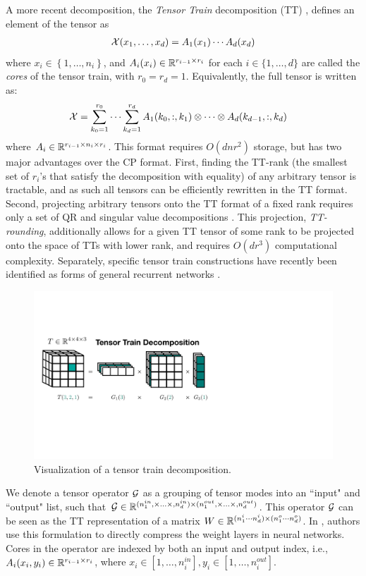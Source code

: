 A more recent decomposition, the \textit{Tensor Train} decomposition (TT) \citep{oseledets2011tensor}, defines an element of the tensor as
\begin{align}
\mathcal{X}(x_1,\ldots,x_d) = A_1(x_1)\cdots A_d(x_d)
\end{align}
where $x_i \in \left\{1,\ldots, n_i\right\}$, and $A_i(x_i) \in \mathbb{R}^{r_{i-1} \times r_{i}}$ for each $i \in \{1,\ldots,d\}$ are called the \textit{cores} of the tensor train, with $r_0 = r_d = 1$. Equivalently, the full tensor is written as:
\begin{align}\label{eq:fullTT}
	\mathcal{X} &= \sum_{k_0 = 1}^{r_0} \cdots \sum_{k_d = 1}^{r_d} A_1(k_0,:,k_1) \otimes \cdots \otimes A_d(k_{d-1},:,k_d) 
\end{align}
where $A_i \in \mathbb{R}^{r_{i-1}\times n_i \times r_i} $. 
This format requires $O(dnr^2)$ storage, but has two major advantages over the CP format. First, finding the TT-rank (the smallest set of $r_i$'s that satisfy the decomposition with equality) of any arbitrary tensor is tractable, and as such all tensors can be efficiently rewritten in the TT format. Second, projecting arbitrary tensors onto the TT format of a fixed rank requires only a set of QR and singular value decompositions \citep{oseledets2011tensor}. This projection, \textit{TT-rounding}, additionally allows for a given TT tensor of some rank to be projected onto the space of TTs with lower rank, and requires $O(dr^3)$ computational complexity. Separately, specific tensor train constructions have recently been identified as forms of general recurrent networks \citep{khrulkov2018generalized}.
\begin{figure}
	\centering
	\includegraphics[width=\textwidth,trim={0 14cm 25cm 10cm},clip]{2_bknd/ttdecomp.pdf}
	\caption[Tensor train decomposition]{\label{fig:ttdecomp} Visualization of a tensor train decomposition.}
\end{figure}
We denote a tensor operator $\mathcal{G}$ as a grouping of tensor modes into an ``input" and ``output" list, such that $\mathcal{G} \in \mathbb{R}^{(n_1^{in},\times\ldots\times,n_d^{in}) \times (n_1^{out},\times\ldots\times,n_d^{out})}$. This operator $\mathcal{G}$ can be seen as the TT representation of a matrix $W \in \mathbb{R}^{(n_1^i\cdots n_d^i) \times (n_1^o\cdots n_d^o)}$. In \cite{novikov2015tensorizing}, authors use this formulation to directly compress the weight layers in neural networks. Cores in the operator are indexed by both an input and output index, i.e., $A_i(x_i,y_i) \in \mathbb{R}^{r_{i-1}\times r_i}$, where $x_i \in [1,\ldots,n_i^{in}], y_i \in [1,\ldots,n_i^{out}]$.

